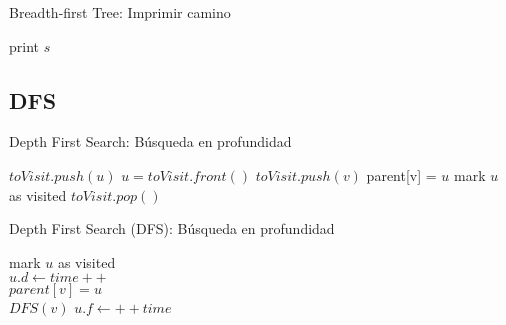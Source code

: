 \documentclass[]{beamer}
\begin{document}
\begin{frame}{Breadth-first Tree: Imprimir camino}
  \begin{algorithm}[H]
    {
      { print $s$ }
    } 
  \end{algorithm}
\end{frame}

\subsection{DFS}
\begin{frame}{Depth First Search: B\'usqueda en profundidad}
  \begin{algorithm}[H]
    {$ toVisit.push(u) $} 
    {
      $u = toVisit.front() $
      {
        {
          {$ toVisit.push(v)  $} \;
          { parent[v] = $u$ } \;
          { mark $u$ as visited } \;
        }
      }
      { $toVisit.pop()$ }
    }
  \end{algorithm}
\end{frame}


\begin{frame}{Depth First Search (DFS): B\'usqueda en profundidad}
  \begin{algorithm}[H]
    mark $u$ as visited \\
    $u.d \gets time++$ \\
    {
      {
        $ parent[v] = u $ \\
        $ DFS(v) $
      }
    }
    $u.f \gets ++time$ \\
  \end{algorithm}
\end{frame}
\end{document}
